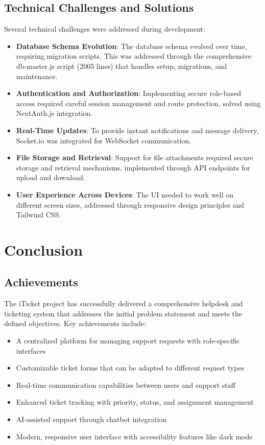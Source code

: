 \documentclass[12pt,a4paper]{article}
\begin{document}
\subsection{Technical Challenges and Solutions}

Several technical challenges were addressed during development:

\begin{itemize}
    \item \textbf{Database Schema Evolution}: The database schema evolved over time, requiring migration scripts. This was addressed through the comprehensive db-master.js script (2005 lines) that handles setup, migrations, and maintenance.
    
    \item \textbf{Authentication and Authorization}: Implementing secure role-based access required careful session management and route protection, solved using NextAuth.js integration.
    
    \item \textbf{Real-Time Updates}: To provide instant notifications and message delivery, Socket.io was integrated for WebSocket communication.
    
    \item \textbf{File Storage and Retrieval}: Support for file attachments required secure storage and retrieval mechanisms, implemented through API endpoints for upload and download.
    
    \item \textbf{User Experience Across Devices}: The UI needed to work well on different screen sizes, addressed through responsive design principles and Tailwind CSS.
\end{itemize}

\section{Conclusion}

\subsection{Achievements}

The iTicket project has successfully delivered a comprehensive helpdesk and ticketing system that addresses the initial problem statement and meets the defined objectives. Key achievements include:

\begin{itemize}
    \item A centralized platform for managing support requests with role-specific interfaces
    \item Customizable ticket forms that can be adapted to different request types
    \item Real-time communication capabilities between users and support staff
    \item Enhanced ticket tracking with priority, status, and assignment management
    \item AI-assisted support through chatbot integration
    \item Modern, responsive user interface with accessibility features like dark mode
\end{itemize}
\end{document}
